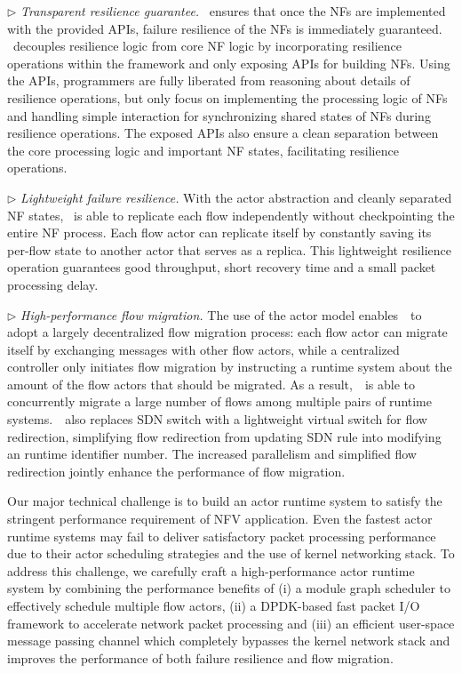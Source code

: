 $\triangleright$ {\em Transparent resilience guarantee.} \nfactor~ensures that once the NFs are implemented with the provided APIs, failure resilience of the NFs is immediately guaranteed. \nfactor~decouples resilience logic from core NF logic by incorporating resilience operations within the framework and only exposing APIs for building NFs. Using the APIs, programmers are fully liberated from reasoning about details of resilience operations, but only focus on implementing the processing logic of NFs and handling simple interaction for synchronizing shared states of NFs during resilience operations. The exposed APIs also ensure a clean separation between the core processing logic and important NF states, facilitating resilience operations.

$\triangleright$ {\em Lightweight failure resilience.} With the actor abstraction and cleanly separated NF states, \nfactor~is able to replicate each flow independently without checkpointing the entire NF process. Each flow actor can replicate itself by constantly saving its per-flow state to another actor that serves as a replica.
This lightweight resilience operation guarantees good throughput, short recovery time and a small packet processing delay.

$\triangleright$ {\em High-performance flow migration.} The use of the actor model enables~\nfactor~to adopt a largely decentralized flow migration process: each flow actor can migrate itself by exchanging messages with other flow actors, while a centralized controller only initiates flow migration by instructing a runtime system about the amount of the flow actors that should be migrated. As a result,~\nfactor~is able to concurrently migrate a large number of flows among multiple pairs of runtime systems.~\nfactor~also replaces SDN switch with a lightweight virtual switch for flow redirection, simplifying flow redirection from updating SDN rule into modifying an runtime identifier number. %
The increased parallelism and simplified flow redirection jointly enhance the performance of flow migration.

Our major technical challenge is to build an actor runtime system to satisfy the stringent performance requirement of NFV application. Even the fastest actor runtime systems \cite{chs-rapc-16} may fail to deliver satisfactory packet processing performance due to their actor scheduling strategies and the use of kernel networking stack. To address this challenge, we carefully craft a high-performance actor runtime system by combining the performance benefits of (i) a module graph scheduler to effectively schedule multiple flow actors, (ii) a DPDK-based \cite{dpdk} fast packet I/O framework \cite{bess} to accelerate network packet processing and (iii) an efficient user-space message passing channel which completely bypasses the kernel network stack and improves the performance of both failure resilience and flow migration.

